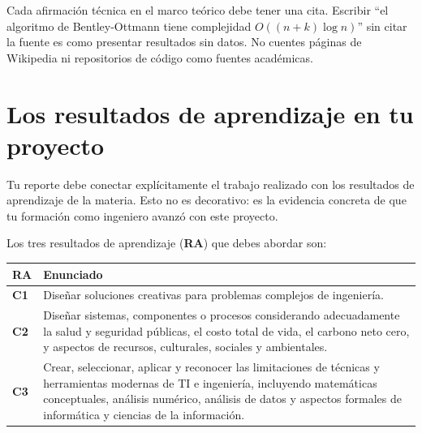 \documentclass[12pt, oneside]{article}
\begin{document}
\begin{recuerda}
  Cada afirmación técnica en el marco teórico debe tener una cita.
  Escribir ``el algoritmo de Bentley-Ottmann tiene complejidad
  $O((n+k)\log n)$'' sin citar la fuente es como presentar resultados
  sin datos.  No cuentes páginas de Wikipedia ni repositorios de
  código como fuentes académicas.
\end{recuerda}

\section{Los resultados de aprendizaje en tu proyecto}
\label{sec:ra}

Tu reporte debe conectar explícitamente el trabajo realizado con los
resultados de aprendizaje de la materia.  Esto no es decorativo:
es la evidencia concreta de que tu formación como ingeniero avanzó
con este proyecto.

Los tres resultados de aprendizaje (\textbf{RA}) que debes abordar son:

\bigskip
\begin{center}
\renewcommand{\arraystretch}{1.4}
\begin{tabular}{p{1.1cm} p{10.8cm}}
  \toprule
  \textbf{RA} & \textbf{Enunciado} \\
  \midrule
  \textbf{C1} & Diseñar soluciones creativas para problemas complejos
                de ingeniería. \\
  \textbf{C2} & Diseñar sistemas, componentes o procesos considerando
                adecuadamente la salud y seguridad públicas, el costo
                total de vida, el carbono neto cero, y aspectos de
                recursos, culturales, sociales y ambientales. \\
  \textbf{C3} & Crear, seleccionar, aplicar y reconocer las limitaciones
                de técnicas y herramientas modernas de TI e ingeniería,
                incluyendo matemáticas conceptuales, análisis numérico,
                análisis de datos y aspectos formales de informática
                y ciencias de la información. \\
  \bottomrule
\end{tabular}
\end{center}

\end{document}

